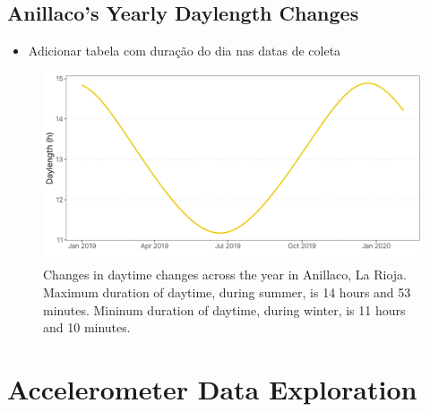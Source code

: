 \documentclass[msc,numbers,hidelinks]{coppe}
\providecommand{\tightlist}{
  \setlength{\itemsep}{0pt}\setlength{\parskip}{0pt}}
\begin{document}
  \hypertarget{anillacos-yearly-daylength-changes}{%
  \section{Anillaco's Yearly Daylength Changes}\label{anillacos-yearly-daylength-changes}}
  \begin{itemize}
  \tightlist
  \item
    Adicionar tabela com duração do dia nas datas de coleta
  \end{itemize}
  \begin{figure}[H]

  {\centering \includegraphics[width=1\linewidth]{../04_figures/appendix/plot_daylength} 

  }

  \caption{Changes in daytime changes across the year in Anillaco, La Rioja. Maximum duration of daytime, during summer, is 14 hours and 53 minutes. Mininum duration of daytime, during winter, is 11 hours and 10 minutes.}\label{fig:appendix-daylength}
  \end{figure}
  \hypertarget{accelerometer-data-exploration}{%
  \chapter{Accelerometer Data Exploration}\label{accelerometer-data-exploration}}
\end{document}
